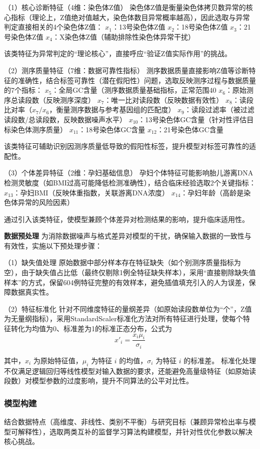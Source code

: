 \documentclass[withoutpreface,bwprint]{cumcmthesis} %
\begin{document}
（1）核心诊断特征（4维：染色体Z值）  
染色体Z值是衡量染色体拷贝数异常的核心指标（理论上，Z值绝对值越大，染色体数目异常概率越高），因此选取与异常判定直接相关的4个染色体Z值：  
$ x_1 $：13号染色体Z值  
$ x_2 $：18号染色体Z值  
$ x_3 $：21号染色体Z值  
$ x_4 $：X染色体Z值（辅助排除性染色体异常干扰）  

该类特征为异常判定的“理论核心”，直接呼应“验证Z值实际作用”的挑战。

（2）测序质量特征（7维：数据可靠性指标）  
测序数据质量直接影响Z值等诊断特征的准确性，结合标签可靠性（潜在假阳性）问题，选取反映测序过程与数据质量的7个指标：  
$ x_5 $：全局GC含量（测序数据质量基础指标，正常范围40%
$ x_6 $：原始测序总读段数（反映测序深度）  
$ x_7 $：唯一比对读段数（反映数据有效性）  
$ x_8 $：读段比对率（$ x_7/x_6 $，衡量测序数据与参考基因组的匹配度）  
$ x_9 $：读段过滤率（被过滤读段数/总读段数，反映数据噪声水平）  
$ x_{10} $：13号染色体GC含量（针对性评估目标染色体测序质量）  
$ x_{11} $：18号染色体GC含量  
$ x_{12} $：21号染色体GC含量  

该类特征可辅助识别因测序质量低导致的假阳性标签，提升模型对标签可靠性的适配性。

（3）个体差异特征（2维：孕妇基础信息）  
孕妇个体特征可能影响胎儿游离DNA检测灵敏度（如BMI过高可能降低检测准确性），结合临床经验选取2个关键指标：  
$ x_{13} $：孕妇BMI（反映体重指数，关联游离DNA浓度）  
$ x_{14} $：孕妇年龄（高龄是染色体异常的风险因素）  

通过引入该类特征，使模型兼顾个体差异对检测结果的影响，提升临床适用性。

\textbf{数据预处理}
为消除数据噪声与格式差异对模型的干扰，确保输入数据的一致性与有效性，实施以下预处理步骤：  

（1）缺失值处理  
原始数据中部分样本存在特征缺失（如个别测序质量指标为空），由于缺失值占比低（最终仅剔除1例全特征缺失样本），采用“直接剔除缺失值样本”的方式，保留604例特征完整的有效样本，避免插值填充引入的人为误差，保障数据真实性。  

（2）特征标准化  
针对不同维度特征的量纲差异（如原始读段数单位为“个”，Z值为无量纲指标），采用StandardScaler标准化方法对所有特征进行处理，使每个特征转化为均值为0、标准差为1的标准正态分布，公式为
$$ x'_i = \frac{x_{i} \mu_i}{\sigma_i} $$

其中，$ x_i $ 为原始特征值，$ \mu_i $ 为特征 $ i $ 的均值，$ \sigma_i $ 为特征 $ i $ 的标准差。  
标准化处理不仅满足逻辑回归等线性模型对输入数据的要求，还能避免高量级特征（如原始读段数）对模型参数的过度影响，提升不同算法的公平对比性。


\subsubsection{模型构建}
结合数据特点（高维度、非线性、类别不平衡）与研究目标（兼顾异常检出率与模型可解释性），选取两类互补的监督学习算法构建模型，并针对性优化参数以解决核心挑战。
\end{document}

